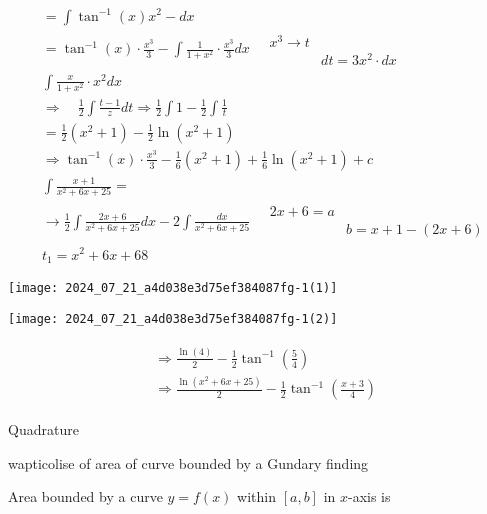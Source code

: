 \documentclass[12pt, a4paper]{article}
\begin{document}
$$
\begin{aligned}
& =\int \tan ^{-1}(x) x^{2}-d x \\
& =\tan ^{-1}(x) \cdot \frac{x^{3}}{3}-\int \frac{1}{1+x^{2}} \cdot \frac{x^{3}}{3} d x \quad \begin{array}{ll}
x^{3} \rightarrow t \\
& d t=3 x^{2} \cdot d x
\end{array} \\
& \int \frac{x}{1+x^{2}} \cdot x^{2} d x \\
& \Rightarrow \quad \frac{1}{2} \int \frac{t-1}{z} d t \Rightarrow \frac{1}{2} \int 1-\frac{1}{2} \int \frac{1}{t} \\
& =\frac{1}{2}\left(x^{2}+1\right)-\frac{1}{2} \ln \left(x^{2}+1\right) \\
& \Rightarrow \tan ^{-1}(x) \cdot \frac{x^{3}}{3}-\frac{1}{6}\left(x^{2}+1\right)+\frac{1}{6} \ln \left(x^{2}+1\right)+c \\
& \int \frac{x+1}{x^{2}+6 x+25}= \\
& \rightarrow \frac{1}{2} \int \frac{2 x+6}{x^{2}+6 x+25} d x-2 \int \frac{d x}{x^{2}+6 x+25} \quad \begin{array}{ll}
2 x+6=a \\
& b=x+1-(2 x+6)
\end{array} \\
& t_{1}=x^{2}+6 x+68
\end{aligned}
$$

\begin{center}
\texttt{[image: 2024\_07\_21\_a4d038e3d75ef384087fg-1(1)]}
\end{center}

\begin{center}
\texttt{[image: 2024\_07\_21\_a4d038e3d75ef384087fg-1(2)]}
\end{center}

$$
\begin{aligned}
& \begin{array}{l}
\Rightarrow \frac{\ln (4)}{2}-\frac{1}{2} \tan ^{-1}\left(\frac{5}{4}\right) \\
\Rightarrow \frac{\ln \left(x^{2}+6 x+25\right)}{2}-\frac{1}{2} \tan ^{-1}\left(\frac{x+3}{4}\right)
\end{array}
\end{aligned}
$$

Quadrature

wapticolise of area of curve bounded by a Gundary finding

Area bounded by a curve $y=f(x)$ within $[a, b]$ in $x$-axis is
\end{document}
